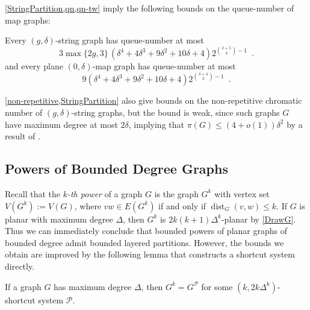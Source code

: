 \documentclass{patmorin}
\DeclareMathOperator{\dist}{dist}
\DeclareMathOperator{\qn}{qn}
\newcommand{\PP}{\mathcal{P}}
\renewcommand{\le}{\leqslant}
\renewcommand{\geq}{\geqslant}
\renewcommand{\leq}{\leqslant}
\begin{document}
\cref{StringPartition,qn,qn-tw} imply the following bounds on the queue-number of map graphs:

\begin{cor}
Every $(g,\delta)$-string graph has queue-number at most 
$$3 \max\{2g,3\} \,(\delta^4 + 4 \delta^3 + 9 \delta^2 + 10 \delta + 4)  2^{\binom{ \delta+5}{4}-1} \enspace.$$
and every plane $(0,\delta)$-map graph  has queue-number at most 
$$ 9 (\delta^4 + 4 \delta^3 + 9 \delta^2 + 10 \delta + 4)  2^{\binom{ \delta+4}{3}-1} \enspace.$$
\end{cor}






\cref{non-repetitive,StringPartition} also give bounds on the non-repetitive chromatic number of $(g,\delta)$-string graphs, but the bound is weak, since such graphs $G$ have maximum degree at most $2\delta$, implying that $\pi(G) \leq (4+o(1))\delta^2$ by a result of \citet{DJKW16}.

\subsection{Powers of Bounded Degree Graphs}
\label{Powers}

Recall that the \emph{$k$-th power} of a graph $G$ is the graph $G^k$ with vertex set $V(G^k):=V(G)$, where $vw\in E(G^k)$ if and only if $\dist_G(v,w)\leq k$. If $G$ is planar with maximum degree $\Delta$, then $G^k$ is $2k(k+1)\Delta^{k}$-planar by \cref{DrawG}. Thus we can immediately conclude that bounded powers of planar graphs of bounded degree admit bounded layered partitions. However, the bounds we obtain are improved by the following lemma that constructs a shortcut system directly. 

\begin{lem}
\label{PowerShortcut}
If a graph $G$ has maximum degree $\Delta$, then $G^k = G^\PP$ for some $(k,2k \Delta^{k})$-shortcut system $\PP$.
\end{lem}
\end{document}
